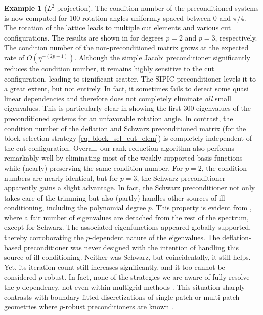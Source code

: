 \documentclass{article}
\numberwithin{equation}{section}
\theoremstyle{definition}
\newtheorem{example}[definition]{Example}
\begin{document}
\begin{example}[$L^2$ projection]
The condition number of the preconditioned systems is now computed for $100$ rotation angles uniformly spaced between $0$ and $\pi/4$. The rotation of the lattice leads to multiple cut elements and various cut configurations. The results are shown in  for degrees $p=2$ and $p=3$, respectively. The condition number of the non-preconditioned matrix grows at the expected rate of $O(\eta^{-(2p+1)})$. Although the simple Jacobi preconditioner significantly reduces the condition number, it remains highly sensitive to the cut configuration, leading to significant scatter. The SIPIC preconditioner levels it to a great extent, but not entirely. In fact, it sometimes fails to detect some quasi linear dependencies and therefore does not completely eliminate \emph{all} small eigenvalues. This is particularly clear in  showing the first $300$ eigenvalues of the preconditioned systems for an unfavorable rotation angle. In contrast, the condition number of the deflation and Schwarz preconditioned matrix (for the block selection strategy \eqref{eq: block_sel_cut_elem}) is completely independent of the cut configuration. Overall, our rank-reduction algorithm also performs remarkably well by eliminating most of the weakly supported basis functions while (nearly) preserving the same condition number. For $p=2$, the condition numbers are nearly identical, but for $p=3$, the Schwarz preconditioner apparently gains a slight advantage. In fact, the Schwarz preconditioner not only takes care of the trimming but also (partly) handles other sources of ill-conditioning, including the polynomial degree $p$. This property is evident from , where a fair number of eigenvalues are detached from the rest of the spectrum, except for Schwarz. The associated eigenfunctions appeared globally supported, thereby corroborating the $p$-dependent nature of the eigenvalues. The deflation-based preconditioner was never designed with the intention of handling this source of ill-conditioning. Neither was Schwarz, but coincidentally, it still helps. Yet, its iteration count still increases significantly, and it too cannot be considered $p$-robust. In fact, none of the strategies we are aware of fully resolve the $p$-dependency, not even within multigrid methods \cite{de2020multigrid,jomo2021hierarchical}. This situation sharply contrasts with boundary-fitted discretizations of single-patch or multi-patch geometries where $p$-robust preconditioners are known \cite{gao2013kronecker,gao2014fast,loli2022easy}.


\end{example}
\end{document}
